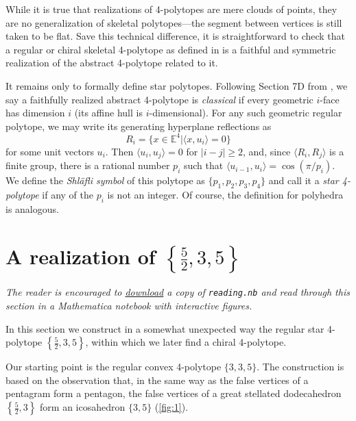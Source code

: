\documentclass{article}
\theoremstyle{definition}
\newcommand{\E}{\mathbb{E}}
\begin{document}
	While it is true that realizations of 4-polytopes are mere clouds of points, they are no generalization of skeletal polytopes---the segment between vertices is still taken to be flat. Save this technical difference, it is straightforward to check that a regular or chiral skeletal 4-polytope as defined in  is a faithful and symmetric realization of the abstract 4-polytope related to it.
	
	\vspace{.5cm}
	
	It remains only to formally define star polytopes. Following Section 7D from \cite{abstract-polytopes}, we say a faithfully realized abstract 4-polytope is \textit{classical} if every geometric $i$-face has dimension $i$ (its affine hull is $i$-dimensional). For any such geometric regular polytope, we may write its generating hyperplane reflections as
	\[R_i=\{x\in\E^4|\langle x,u_i\rangle=0\}\]
	for some unit vectors $u_i$. Then $\langle u_i,u_j\rangle=0$ for $|i-j|\geq2$, and, since $\langle R_i,R_j\rangle$ is a finite group, there is a rational number $p_i$ such that $\langle u_{i-1},u_i\rangle=\cos(\pi/p_i)$. We define the \textit{Shläfli symbol} of this polytope as $\{p_1,p_2,p_3,p_4\}$ and call it a \textit{star 4-polytope} if any of the $p_i$ is not an integer. Of course, the definition for polyhedra is analogous.

	\section{A realization of $\left\{\frac{5}{2},3,5\right\}$}
	\textit{The reader is encouraged to \href{https://github.com/danimalabares/tesina/blob/main/reading.nb}{download} a copy of \texttt{reading.nb} and read through this section in a Mathematica notebook with interactive figures.}
	
	In this section we construct in a somewhat unexpected way the regular star 4-polytope $\left\{\frac{5}{2},3,5\right\}$, within which we later find a chiral 4-polytope.
	
	Our starting point is the regular convex 4-polytope $\{3,3,5\}$. The construction is based on the observation that, in the same way as the false vertices of a pentagram form a pentagon, the false vertices of a great stellated dodecahedron $\left\{\frac{5}{2},3\right\}$ form an icosahedron $\{3,5\}$ (\cref{fig:1}).
	
\end{document}
